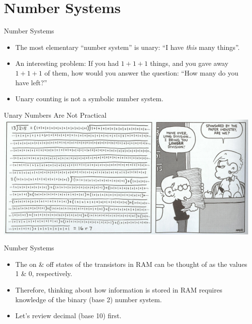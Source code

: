 \documentclass[graphics]{beamer}
\begin{document}
\section{Number Systems}
\begin{frame}{Number Systems}
    \begin{itemize}
        \item The most elementary ``number system'' is unary: ``I have \textit{this} many things''.
        \item An interesting problem: If you had $1+1+1$ things, and you gave away $1+1+1$ of them, how would you answer the question: ``How many do you have left?''
        \item Unary counting is not a symbolic number system.
    \end{itemize}
\end{frame}

\begin{frame}{Unary Numbers Are Not Practical}
    \includegraphics[scale=0.2]{L02_ArchNumbersSystems/L2_p22.png}
\end{frame}

\begin{frame}{Number Systems}
    \begin{itemize}
        \item The on \& off states of the transistors in RAM can be thought of as the values 1 \& 0, respectively.
        \item Therefore, thinking about how information is stored in RAM requires knowledge of the binary (base 2) number system.
        \item Let's review decimal (base 10) first.
    \end{itemize}
\end{frame}
\end{document}
